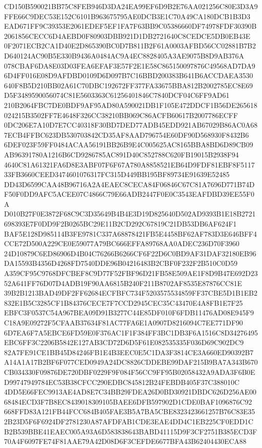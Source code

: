 \documentclass[UTF8,fontset=fandol,zihao=-4,a4paper]{ctexart}
\begin{document}
{{CD150B590021BB75C8FEB946D3DA24EA99EF6D9B2E76AA021256C80E3D3A9FFE66C9DEC53E152C6101B963675795AE0DCB3E1C70A49CA180DCB1B3D3
EAD671FF9C39353E2061EDEF5EF1FA7F63BB9C05386660DF74978FDF30390B2061856CECC6D4AEBD0F80903DBB921D1DB2721640C8CEDCE5DB0EB43E
0F2071ECB2CA1D40E2D865390BC0D7B811B2F61A0003AFBD56CC02881B7B2D640124AC90B5E330B9436A0484AC9A4EC8828405A3AE9075B8D9AB376A
078CBAF6DA8E03D03FEA6EFAF3E57F2E1E58C865150097876C49568AD7DA96D4FF016E08D9AFDBD0109D6D097B7C16BBD200383B641B6ACCDAEA3530
640F8B5D210BB02A61C70DBC192672FF377FA33675BBA812B2002785EC8E69D5F3489590056074C81E5603363C61256401846C7840DCF04C6FF9AD61
210B2064FBC7DE0BDF9AF95AD80A590021DB1F105E472DDCF1B56DE265618024215B3502FF7E4648F326CC38210BB069C86ACFB60617B2007786ECFF
0DC206E7A10D7E7CC40318F30BD7DED77ADB45EDD921AB67029B86AC0A687ECB4FFBC623DB530703842CD35AF8AAD796754E60DF90D568930F8432B6
6DEF023F59FF0484ACAA56191BB26B9E4C005625AC8165BBA8BD6D89CB09AB96391780A1216B6CD9286785AC891D40C852788C620FB19015B2938F94
4640C81A61321FA6D8E3ABF07F6F67A780A8858521EB64D9FDF81EBF8F511733FB3660CEED3474601076317FC315D449BB195BF89734E91639E52485
DD43D6599CAA48B96716A2A4EAEC8CECA84F06846C67C81A7696D771B74DF50F0DD9AFC5ACEE07C4866C79E66ADB2447F0E0C3543EAFDBD39EE55F0A
D010B27F0E3872F68C9C3D35649B4B4E3D19D825640D502AD9393B1E18B2721698393E7F0DD9F2B0265BC29E11B2CD292C67819C21DB53DB6AF624F1
BAF5E128D985114B3FE9781C337A68878421FB5E4458BF62AF783D3E646BFF4CCE72D500A229CE0E59077A79BC666EFFA89768AA0ADEC236D70F3960
24D10879C6ED86906D4B04C76266B6266CF6F22D6C0BD9AF31DAF32180EB96DA15593B4356D4268FD7540DDE96B04216483B2CBF0F232F2B510C0D59
A359CF95C9768DFCBEF8C9D77F52FBF96D21FB58E509AE1F8D9B47E692D2352A641FF76D07D4ADB19F90AA6815B240F211B8702AF8535E87876CC81E
39B2B1213BAD49DF2FF62684ECFBFC734F5203575534859FF37CBE5D1B1EB2832E1B5C3285CF1B84376CECE7F7CCD2945CEC35C43470E4A8FB1E7F25
EBFC3F0537C54A967BEA09D91B3277C44E85DF010F6FDB11476AD08E945F9C18A9E09272F5CFAAB37634F81AC77FA6E1A0907D8216094C7EE771DF90
6D7EA6F7A5EBCE6FD59E0F376AC1F1F384FF3BC1DB3F6A1516C8D34276495EBC6FF3C2206B5842E127AB3CD72D6D5F61E082535335F036D69C902DC9
82A7FE91CE1BB45D84246FB1E4B3EEC0E5C1DA3F3814CE3A660ED90392B7A14A1A17B2BF6F077CED0949A24DC8826CDDEBE99DAF215B9BA7A343B670
CB034330F09876DE720DBF0229F9F084F56CC9FF95B02058432A9ADA3F6B0ED99747949784EC53B38CFCC290EDBC845812B24FEBDB405F37C388010C
4DD5E66FEC9913AE4AD8E7C34BB29FDEA26D0BD30921DBDC626D256AE0068484ECD3F7B8EC8439018309105BAEE6DFB597902D1CDE0BAF1096876C92
668FFD83A121FB44FCC684B405FAE3B5A7BA5CBE8323423661257B76C83E352B23D5F6F6924DF2781230A87AFDFAB1CDE3EAE4DD4C1EB225CF0EDD1C
B2B539BBE41EAEC005A93A6D583838643BABD41115D9F3CF2751B385ECD3F70A4F6097FE74F81AAE79A42D08D6F3CEFDE6677BFA43B62404430ECA88
}}
\end{document}
